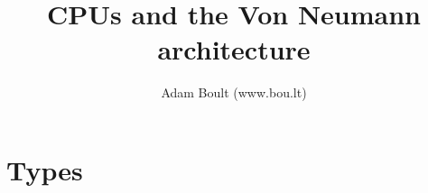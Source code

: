 \documentclass[oneside]{book}
\begin{document}
\author{Adam Boult (www.bou.lt)}
\title{CPUs and the Von Neumann architecture}
\maketitle

\setcounter{tocdepth}{0}
\tableofcontents



\part{Types}


\end{document}
